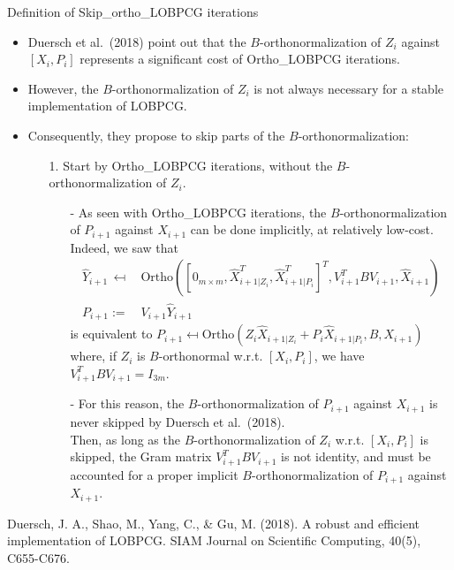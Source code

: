 \documentclass[t,usepdftitle=false]{beamer}
\begin{document}
\begin{frame}{Definition of Skip\_ortho\_LOBPCG iterations}
	\begin{itemize}
	\item Duersch et al.~(2018) point out that the $B$-orthonormalization of $Z_i$ against $[X_i,P_i]$ represents a significant cost of Ortho\_LOBPCG iterations.
	\item However, the $B$-orthonormalization of $Z_i$ is not always necessary for a stable implementation of LOBPCG.
	\item Consequently, they propose to skip parts of the $B$-orthonormalization:\tinyskip
	\begin{enumerate}
	\item[1.] Start by Ortho\_LOBPCG iterations, without the $B$-orthonormalization of $Z_i$.\tinyskip
	\begin{itemize}
	\item[-] As seen with Ortho\_LOBPCG iterations, the $B$-orthonormalization of $P_{i+1}$ against $X_{i+1}$ can be done implicitly, at relatively low-cost.
	Indeed, we saw that
	\begin{align*}
	\hat{Y}_{i+1}\,\mapsfrom&\,\text{Ortho}([0_{m\times m},\hat{X}_{{i+1}|Z_i}^T,\hat{X}_{{i+1}|P_i}^T]^T,V_{i+1}^TBV_{i+1},\hat{X}_{i+1})\\
	P_{i+1}:=&\,V_{i+1}\hat{Y}_{i+1}
	\end{align*}		
	is equivalent to
	$P_{i+1}\mapsfrom\text{Ortho}(Z_i\hat{X}_{i+1|Z_i}+P_i\hat{X}_{i+1|P_i},B,X_{i+1})$ where, if $Z_i$ is $B$-orthonormal w.r.t. $\![X_i,P_i]$, we have $V_{i+1}^TBV_{i+1}=I_{3m}$.
	\item[-] For this reason, the $B$-orthonormalization of $P_{i+1}$ against $X_{i+1}$ is never skipped by Duersch et al.~(2018).\\
	Then, as long as the $B$-orthonormalization of $Z_i$ w.r.t. $\![X_i,P_i]$ is skipped, the Gram matrix $V_{i+1}^TBV_{i+1}$ is not identity, and must be accounted for a proper implicit $B$-orthonormalization of $P_{i+1}$ against $X_{i+1}$.
	\end{itemize}
	\end{enumerate}
	\end{itemize}	
	\smallskip
	\tiny{Duersch, J. A., Shao, M., Yang, C., \& Gu, M. (2018). A robust and efficient implementation of LOBPCG. SIAM Journal on Scientific Computing, 40(5), C655-C676.}
\end{frame}
\end{document}
